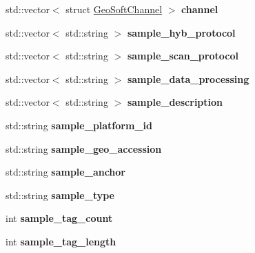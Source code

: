 \begin{DoxyCompactItemize}
\mbox{\label{structGeoSoft_a79286ccfa9c70a768dbaa4f4e6f7c780}} 
std\+::vector$<$ struct \mbox{\hyperlink{structGeoSoftChannel}{Geo\+Soft\+Channel}} $>$ {\bfseries channel}
\item 
\mbox{\label{structGeoSoft_a8422cb69c02d87824ffb177994d94b4f}} 
std\+::vector$<$ std\+::string $>$ {\bfseries sample\+\_\+hyb\+\_\+protocol}
\item 
\mbox{\label{structGeoSoft_a7505eeeb224cfbe96664aeb2c5bda0bb}} 
std\+::vector$<$ std\+::string $>$ {\bfseries sample\+\_\+scan\+\_\+protocol}
\item 
\mbox{\label{structGeoSoft_a6cfddc4e445a670797c93d6dafae0c8e}} 
std\+::vector$<$ std\+::string $>$ {\bfseries sample\+\_\+data\+\_\+processing}
\item 
\mbox{\label{structGeoSoft_a90bb6b0962cd6a5f77543fe7d8b0a745}} 
std\+::vector$<$ std\+::string $>$ {\bfseries sample\+\_\+description}
\item 
\mbox{\label{structGeoSoft_ab66635819f673343c594bd8feeab03e3}} 
std\+::string {\bfseries sample\+\_\+platform\+\_\+id}
\item 
\mbox{\label{structGeoSoft_a0d49a29c758d27e7f11dca8fe9f140ec}} 
std\+::string {\bfseries sample\+\_\+geo\+\_\+accession}
\item 
\mbox{\label{structGeoSoft_a6a8d1f82bc86f6d7a41093909fa4a0e2}} 
std\+::string {\bfseries sample\+\_\+anchor}
\item 
\mbox{\label{structGeoSoft_aeac2b5c7b8bc23ac8ee07bf8821b9ac0}} 
std\+::string {\bfseries sample\+\_\+type}
\item 
\mbox{\label{structGeoSoft_ac83a62c8fb5d83be1852bae9aee0be89}} 
int {\bfseries sample\+\_\+tag\+\_\+count}
\item 
\mbox{\label{structGeoSoft_a47b2aea879efc78cdd23aa1671d85556}} 
int {\bfseries sample\+\_\+tag\+\_\+length}
\item 
\mbox{\label{structGeoSoft_a1390a600f62f6153880bf563111a2c23}} 

\end{DoxyCompactItemize}
